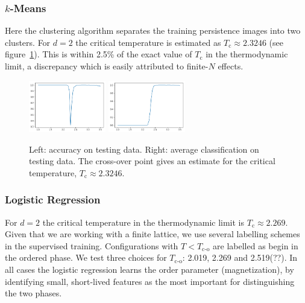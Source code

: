 \documentclass[11pt]{article}
\begin{document}
\subsubsection{$k$-Means}
Here the clustering algorithm separates the training persistence images into two clusters. For $d=2$ the critical temperature is estimated as $T_\text{c}\approx 2.3246$ (see figure~\ref{ref:IsingKmeans}). This is within 2.5\% of the exact value of $T_\text{c}$ in the thermodynamic limit, a discrepancy which is easily attributed to finite-$N$ effects.

\begin{figure}[h]
    \centering
    \includegraphics[width=0.3\textwidth]{ising_images/kmeans_2d_ising}
    \includegraphics[width=0.3\textwidth]{ising_images/kmeans_avg_2d_ising}
    \caption{Left: accuracy on testing data. Right: average classification on testing data. The cross-over point gives an estimate for the critical temperature, $T_\text{c}\approx 2.3246$.}
    \label{ref:IsingKmeans}
\end{figure}


\subsubsection{Logistic Regression}
For $d=2$ the critical temperature in the thermodynamic limit is $T_\text{c}\approx 2.269$. Given that we are working with a finite lattice, we use several labelling schemes in the supervised training. Configurations with $T<T_\text{c-o}$ are labelled as begin in the ordered phase. We test three choices for $T_\text{c-o}$: 2.019, 2.269 and 2.519(??). In all cases the logistic regression learns the order parameter (magnetization), by identifying small, short-lived features as the most important for distinguishing the two phases.
\end{document}
